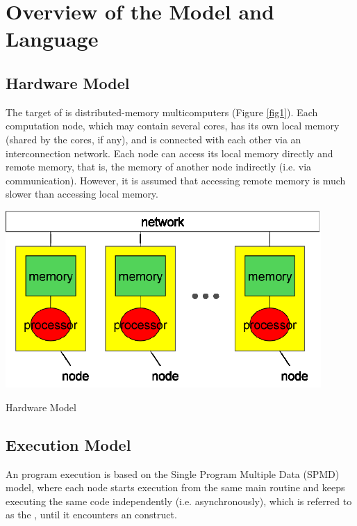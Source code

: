 \chapter{Overview of the {\XMP} Model and Language}
\label{chap: overview}

\section{Hardware Model}

The target of {\XMP} is distributed-memory multicomputers (Figure
\ref{fig1}). Each computation node, which may contain several cores, has
its own local memory (shared by the cores, if any), and is connected
with each other via an interconnection network.
%
Each node can access its local memory directly and remote memory, that
is, the memory of another node indirectly (i.e. via
communication). However, it is assumed that accessing remote memory is 
much slower than accessing local memory.

\begin{myfigure}
\includegraphics[width=12cm]{figs/Fig1.eps}
  \caption{Hardware Model}\label{fig1}
\end{myfigure}

\section{Execution Model}

An {\XMP} program execution is based on the Single Program Multiple Data
(SPMD) model, where each node starts execution from the same main
routine and keeps executing the same code independently
(i.e. asynchronously), which is referred to as the {\it {}}, until it encounters an {\XMP} construct.

%

